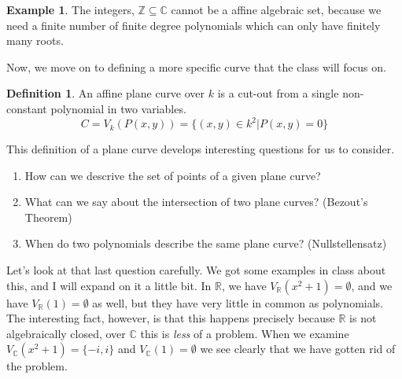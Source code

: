 \documentclass[11pt,a4paper]{article}
\theoremstyle{plain}
\theoremstyle{definition}
\newtheorem{definition}[theorem]{Definition}
\newtheorem{example}[theorem]{Example}
\theoremstyle{remark}
\begin{document}
\begin{example}
    The integers, $\mathbb{Z} \subseteq \mathbb{C}$ cannot be a affine algebraic set, because we need a finite number of finite degree polynomials which can only have finitely many roots.
\end{example}

\noindent
Now, we move on to defining a more specific curve that the class will focus on.

\begin{definition}
    An affine plane curve over $k$ is a cut-out from a single non-constant polynomial in two variables. $$C = V_k(P(x,y)) = \{(x,y) \in k^2 | P(x,y) = 0\}$$
\end{definition}

\noindent
This definition of a plane curve develops interesting questions for us to consider. \begin{enumerate}
    \item How can we descrive the set of points of a given plane curve?
    \item What can we say about the intersection of two plane curves? (Bezout's Theorem)
    \item When do two polynomials describe the same plane curve? (Nullstellensatz)
\end{enumerate}

\noindent
Let's look at that last question carefully. We got some examples in class about this, and I will expand on it a little bit. In $\mathbb{R}$, we have $V_\mathbb{R}(x^2+1) = \emptyset$, and we have $V_\mathbb{R}(1) = \emptyset$ as well, but they have very little in common as polynomials. The interesting fact, however, is that this happens precisely because $\mathbb{R}$ is not algebraically closed, over $\mathbb{C}$ this is \emph{less} of a problem. When we examine $V_\mathbb{C}(x^2+1) = \{-i,i\}$ and $ V_\mathbb{C}(1) = \emptyset$ we see clearly that we have gotten rid of the problem. 
\end{document}
